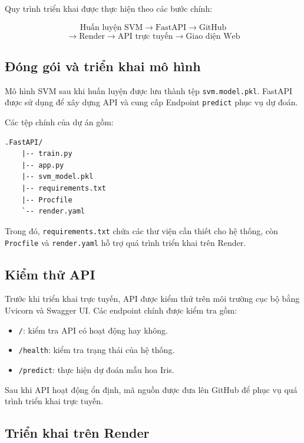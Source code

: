 \documentclass[12pt,a4paper]{report}
\begin{document}
	\noindent
	Quy trình triển khai được thực hiện theo các bước chính:
	
	$$
	\text{Huấn luyện SVM}
	\rightarrow
	\text{FastAPI}
	\rightarrow
	\text{GitHub}
	$$
	$$
	\rightarrow
	\text{Render}
	\rightarrow
	\text{API trực tuyến}
	\rightarrow
	\text{Giao diện Web}
	$$
	
	\subsection{Đóng gói và triển khai mô hình}
	
	Mô hình SVM sau khi huấn luyện được lưu thành tệp \texttt{svm.model.pkl}. FastAPI được sử dụng để xây dựng API và cung cấp Endpoint \texttt{predict} phục vụ dự đoán.
	
	Các tệp chính của dự án gồm:
	
	\begin{lstlisting}
.FastAPI/
	|-- train.py
	|-- app.py
	|-- svm_model.pkl
	|-- requirements.txt
	|-- Procfile
	`-- render.yaml
	\end{lstlisting}
	
	Trong đó, \texttt{requirements.txt} chứa các thư viện cần thiết cho hệ thống, còn \texttt{Procfile} và \texttt{render.yaml} hỗ trợ quá trình triển khai trên Render.
	
	\subsection{Kiểm thử API}
	
	Trước khi triển khai trực tuyến, API được kiểm thử trên môi trường cục bộ bằng Uvicorn và Swagger UI. Các endpoint chính được kiểm tra gồm:
	
	\begin{itemize}
		\item \texttt{/}: kiểm tra API có hoạt động hay không.
		\item \texttt{/health}: kiểm tra trạng thái của hệ thống.
		\item \texttt{/predict}: thực hiện dự đoán mẫu hoa Iris.
	\end{itemize}
	
	Sau khi API hoạt động ổn định, mã nguồn được đưa lên GitHub để phục vụ quá trình triển khai trực tuyến.
	
	\subsection{Triển khai trên Render}
	
\end{document}
